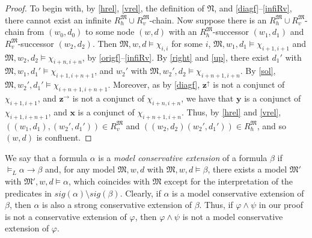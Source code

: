 \documentclass[10pt,a4paper]{amsart}
\theoremstyle{plain}
\theoremstyle{definition}
\newcommand{\sig}{\mathit{sig}}
\newcommand{\bbvarup}{\Zvar^\uparrow}
\newcommand{\bbvarright}{\Zvar^\to}
\newcommand{\fform}[1]{\boldsymbol{#1}}
\newcommand{\xvar}{\fform{x}}
\newcommand{\yvar}{\fform{y}}
\newcommand{\ovar}{\fform{o}}
\newcommand{\Zvar}{\fform{z}}
\begin{document}
\begin{proof}
	To begin with, by \eqref{hrel}, \eqref{vrel}, the definition of $\mathfrak N$, and \eqref{diagf}--\eqref{infiRv},
	there cannot exist an infinite $R_{h}^\mathfrak M\cup R_{v}^\mathfrak M$-chain.
	Now suppose there is an $R_{h}^\mathfrak M\cup R_{v}^\mathfrak M$-chain from $(w_0,d_0)$
	to some node $(w,d)$ with an $R_{h}^\mathfrak M$-successor $(w_{1},d_{1})$ and $R_{v}^\mathfrak M$-successor $(w_{2},d_{2})$. Then $\mathfrak M,w,d\models \chi_{i,i}$ for some $i$, 
	$\mathfrak M,w_{1},d_{1}\models \chi_{i+1,i+1}$ and $\mathfrak M,w_{2},d_{2}\models \chi_{i+n,i+n}$, by \eqref{origf}--\eqref{infiRv}. 
	By \eqref{right} and \eqref{up},
	there exist $d_{1}'$ with $\mathfrak M,w_{1},d_{1}'\models \chi_{i+1,i+n+1}$, and $w_{2}'$ with $\mathfrak M,w_{2}',d_{2}\models \chi_{i+n+1,i+n}$. 
	By \eqref{sol}, $\mathfrak M,w_{2}',d_{1}'\models \chi_{i+n+1,i+n+1}$.	
	Moreover, as by \eqref{diagf}, $\bbvarup$ is not a conjunct of $\chi_{i+1,i+1}$, and $\bbvarright$  is not a conjunct of $\chi_{i+n,i+n}$, we have that $\yvar$ is a conjunct of $\chi_{i+1,i+n+1}$, and 
	$\xvar$ is a conjunct of $\chi_{i+n+1,i+n}$. Thus, by \eqref{hrel} and \eqref{vrel},
	$((w_{1},d_{1}),(w_{2}',d_{1}'))\in R_{v}^\mathfrak M$ and $((w_{2},d_{2})(w_{2}',d_{1}'))\in R_{h}^\mathfrak M$,
	and so $(w,d)$ is confluent.
\end{proof}

We say that a formula $\alpha$ is a \emph{model conservative extension} of a formula $\beta$
if $\models_{L} \alpha \rightarrow \beta$ and, for any model $\mathfrak{M},w,d$
with $\mathfrak{M},w,d\models \beta$, there exists a model $\mathfrak{M}'$
with $\mathfrak{M}',w,d\models \alpha$, which coincides with $\mathfrak{M}$ except for the interpretation of the predicates in $\sig(\alpha)\setminus\sig(\beta)$.
Clearly, if  $\alpha$ is a model conservative extension of $\beta$, then $\alpha$ is also a 
strong conservative extension of $\beta$.  Thus, if $\varphi \wedge \psi$ in our proof is not a conservative extension of $\varphi$, then $\varphi \wedge \psi$ is not a model conservative extension of $\varphi$. 
\end{document}
